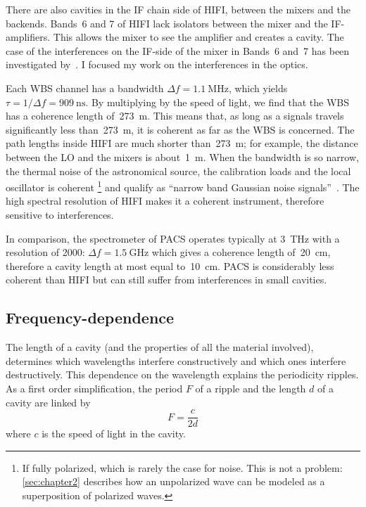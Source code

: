 There are also cavities in the IF chain side of HIFI, between the mixers and the backends.
Bands~6 and 7 of HIFI lack isolators between the mixer and the IF-amplifiers.
This allows the mixer to see the amplifier and creates a cavity.
The case of the interferences on the IF-side of the mixer in Bands~6 and~7 has been investigated by~\textcite{higgins2011}.
I focused my work on the interferences in the optics.

Each WBS channel has a bandwidth $\Delta f = \SI{1.1}{\mega\hertz}$,
which yields $\tau = 1 / \Delta f = \SI{909}{\nano\second}$.
By multiplying by the speed of light, we find that the WBS has a coherence length of~\SI{273}{\meter}.
This means that, as long as a signals travels significantly less than~\SI{273}{\meter}, it is coherent as far as the WBS is concerned.
The path lengths inside HIFI are much shorter than~\SI{273}{\meter};
for example, the distance between the LO and the mixers is about~\SI{1}{\meter}.
When the bandwidth is so narrow, the thermal noise of the astronomical source, the calibration loads and the local oscillator is coherent%
\footnote{If fully polarized, which is rarely the case for noise.  This is not a problem: \cref{sec:chapter2} describes how an unpolarized wave can be modeled as a superposition of polarized waves.}
 and qualify as ``narrow band Gaussian noise signals''~\autocite{siegman1986lasers}.
The high spectral resolution of HIFI makes it a coherent instrument, therefore sensitive to interferences.

In comparison, the spectrometer of PACS operates typically at \SI{3}{\tera\hertz} with a resolution of 2000: $\Delta f = \SI{1.5}{\giga\hertz}$ which gives a coherence length of~\SI{20}{\centi\meter}, therefore a cavity length at most equal to~\SI{10}{\centi\meter}.
PACS is considerably less coherent than HIFI but can still suffer from interferences in small cavities.

\subsection{Frequency-dependence}

The length of a cavity (and the properties of all the material involved), determines which wavelengths interfere constructively and which ones interfere destructively.
This dependence on the wavelength explains the periodicity ripples.
As a first order simplification, the period $F$ of a ripple and the length $d$ of a cavity are linked by
\begin{equation}
    F = \frac{c}{2d}
\end{equation}
where $c$ is the speed of light in the cavity.

